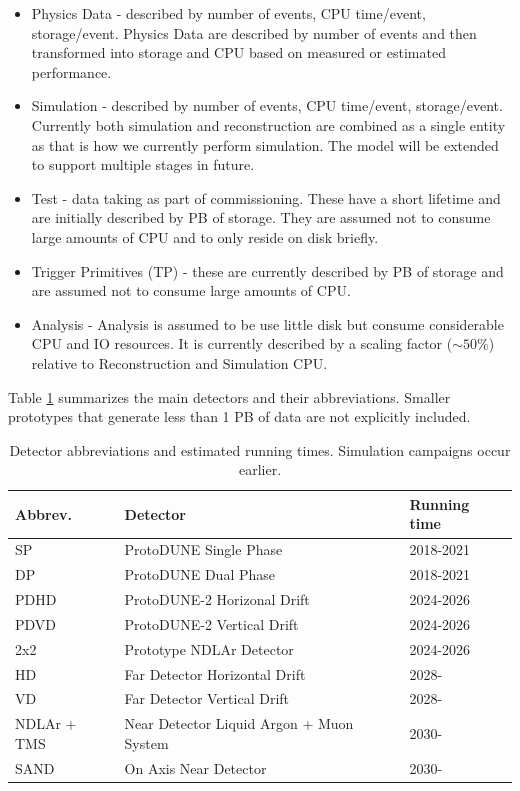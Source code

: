 \documentclass[12pt]{article}
\begin{document}
\begin{itemize}
\item Physics Data - described by number of events, CPU time/event, storage/event.  Physics Data are described by number of events and then transformed into storage and CPU based on measured or estimated performance. 
\item Simulation - described by number of events,  CPU time/event, storage/event.  Currently both simulation and reconstruction are combined as a single entity as that is how we currently perform simulation.  The model will be extended to support multiple stages in future. 
\item Test - data taking as part of commissioning.  These have a short lifetime and are initially described by PB of storage. They are assumed not to consume large amounts of CPU and to only reside on disk briefly. 
\item Trigger Primitives (TP) -  these are currently described by PB of storage and are assumed not to consume large amounts of CPU.  
\item Analysis - Analysis is assumed to be use little disk but consume considerable CPU and IO resources.  It is currently described by a scaling factor ($\sim 50\%$) relative to Reconstruction and Simulation CPU.
\end{itemize}

 Table \ref{tab:detectors} summarizes the main detectors and their abbreviations. Smaller prototypes that generate less than 1 PB of data  are not explicitly included. 

\begin{table}[h]
\begin{centering}
  \begin{tabular}{|l|l|l|}
     \hline
    Abbrev. & Detector & Running time\\
    \hline
    SP & ProtoDUNE Single Phase & 2018-2021\\
    DP & ProtoDUNE Dual Phase & 2018-2021\\
    PDHD & ProtoDUNE-2 Horizonal Drift & 2024-2026\\
    PDVD & ProtoDUNE-2 Vertical Drift & 2024-2026\\
    2x2& Prototype NDLAr Detector & 2024-2026\\
    HD & Far Detector Horizontal Drift & 2028-\\
    VD & Far Detector Vertical Drift & 2028-\\
    NDLAr + TMS & Near Detector Liquid Argon + Muon System & 2030-\\
    SAND & On Axis Near Detector & 2030- \\
     \hline
     \end{tabular}
       \caption{Detector abbreviations and estimated running times.  Simulation campaigns occur earlier. }\label{tab:detectors}
  \end{centering}
   
     \end{table}
     
\end{document}
